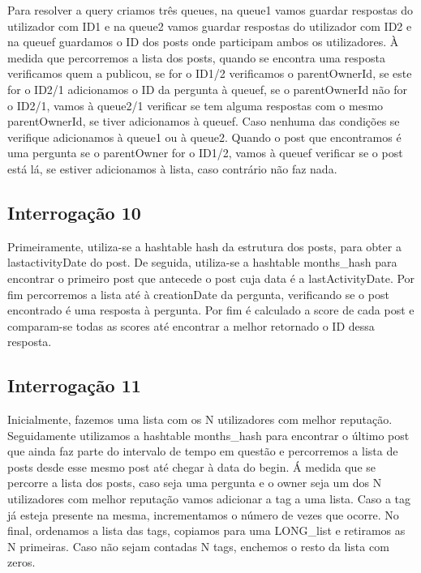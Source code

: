 \documentclass[10pt]{article}
\begin{document}
	Para resolver a query criamos três queues, na queue1 vamos guardar respostas do utilizador com ID1 e na queue2 vamos guardar respostas do utilizador com ID2 e na queuef guardamos o ID dos posts onde participam ambos os utilizadores. À medida que percorremos a lista dos posts, quando se encontra uma resposta verificamos quem a publicou, se for o ID1/2 verificamos o parentOwnerId, se este for o ID2/1 adicionamos o ID da pergunta à queuef, se o parentOwnerId não for o ID2/1, vamos à queue2/1 verificar se tem alguma respostas com o mesmo parentOwnerId, se tiver adicionamos à queuef. Caso nenhuma das condições se verifique adicionamos à queue1 ou à queue2. Quando o post que encontramos é uma pergunta se o parentOwner for o ID1/2, vamos à queuef verificar se o post está lá, se estiver adicionamos à lista, caso contrário não faz nada.

\subsection{Interrogação 10}

	Primeiramente, utiliza-se a hashtable hash da estrutura dos posts, para obter a lastactivityDate do post. De seguida, utiliza-se a hashtable months\_hash para encontrar o primeiro post que antecede o post cuja data é a lastActivityDate. Por fim percorremos a lista até à creationDate da pergunta, verificando se o post encontrado é uma resposta à pergunta. Por fim é calculado a score de cada post e comparam-se todas as scores até encontrar a melhor retornado o ID dessa resposta.

\subsection{Interrogação 11}

	Inicialmente, fazemos uma lista com os N utilizadores com melhor reputação. Seguidamente utilizamos a hashtable months\_hash para encontrar o último post que ainda faz parte do intervalo de tempo em questão e percorremos a lista de posts desde esse mesmo post até chegar à data do begin. Á medida que se percorre a lista dos posts, caso seja uma pergunta e o owner seja um dos N utilizadores com melhor reputação vamos adicionar a tag a uma lista. Caso a tag já esteja presente na mesma, incrementamos o número de vezes que ocorre. No final, ordenamos a lista das tags, copiamos para uma LONG\_list e retiramos as N primeiras. Caso não sejam contadas N tags, enchemos o resto da lista com zeros.
\end{document}
